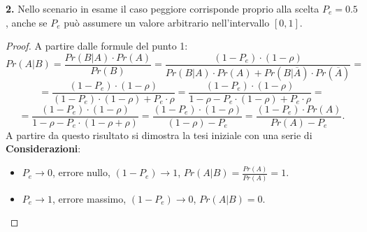 \documentclass[12pt,oneside,openany]{memoir}
\numberwithin{equation}{subsection}
\begin{document}
\bigbreak\noindent
\textbf{2.} Nello scenario in esame il caso peggiore corrisponde proprio alla
scelta $P_e = 0.5$, anche se $P_e$ pu\`o assumere un valore arbitrario
nell'intervallo $[0, 1]$.
\begin{proof}
A partire dalle formule del punto 1:
\[
    Pr(A | B) = \frac{Pr(B | A) \cdot Pr(A)}{Pr(B)} = \frac{(1 - P_e) \cdot 
    (1 - \rho)}{Pr(B | A) \cdot Pr(A) + Pr(B | \overline{A}) \cdot
    Pr(\overline{A})} =
\]
\[
    = \frac{(1 - P_e) \cdot (1 - \rho)}{(1 - P_e) \cdot (1 - \rho) + P_e \cdot
    \rho} = \frac{(1 - P_e) \cdot (1 - \rho)}{1 - \rho - P_e \cdot (1 - \rho) +
    P_e \cdot \rho} =
\]
\[
    = \frac{(1 - P_e) \cdot (1 - \rho)}{1 - \rho - P_e \cdot (1 - \rho + \rho)}
    = \frac{(1 - P_e) \cdot (1 - \rho)}{(1 - \rho) - P_e} = \frac{(1 - P_e)
    \cdot Pr(A)}{Pr(A) - P_e}.
\]
A partire da questo risultato si dimostra la tesi iniziale con una serie di
\textbf{Considerazioni}:\\
\begin{itemize}
    \item $P_e \rightarrow 0$, errore nullo, $(1 - P_e) \rightarrow 1$,
        $Pr(A | B) = \frac{Pr(A)}{Pr(A)} = 1$.
    \item $P_e \rightarrow 1$, errore massimo, $(1 - P_e) \rightarrow 0$,
        $Pr(A | B) = 0$.
\end{itemize}
\end{proof}


\newpage
\end{document}
